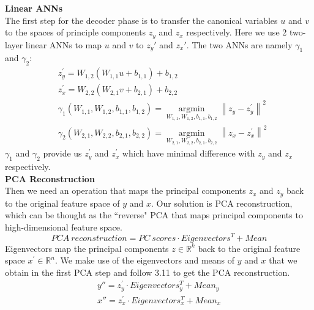 \documentclass[12pt]{report} %
\newcommand{\norm}[1]{\left\lVert #1 \right\rVert}
\begin{document}
\textbf{Linear ANNs}\\
The first step for the decoder phase is to transfer the canonical variables $u$ and $v$ to the spaces of principle components $z_y$ and $z_x$ respectively. Here we use 2 two-layer linear ANNs to map $u$ and $v$ to $z_y{'}$ and $z_x{'}$. The two ANNs are namely $\gamma_1$ and $\gamma_2$:
\begin{equation}
\begin{split}
&z_y^{'}=W_{1,2}(W_{1,1}u+b_{1,1})+b_{1,2} \\
&z_x^{'}=W_{2,2}(W_{2,1}v+b_{2,1})+b_{2,2} \\
&\gamma_1(W_{1,1},W_{1,2},b_{1,1},b_{1,2})=\operatorname*{argmin}_{W_{1,1},W_{1,2},b_{1,1},b_{1,2}}\norm{z_y-z_y^{'}}^2 \\
&\gamma_2(W_{2,1},W_{2,2},b_{2,1},b_{2,2})=\operatorname*{argmin}_{W_{2,1},W_{2,2},b_{2,1},b_{2,2}}\norm{z_x-z_x^{'}}^2
\end{split}
\end{equation}
$\gamma_1$ and $\gamma_2$ provide us $z_y^{'}$ and $z_x^{'}$ which have minimal difference with $z_y$ and $z_x$ respectively.\\

\textbf{PCA Reconstruction}\\
Then we need an operation that maps the principal components $z_x$ and $z_y$ back to the original feature space of $y$ and $x$. Our solution is PCA reconstruction, which can be thought as the ``reverse" PCA that maps principal components to high-dimensional feature space.
\begin{equation}
PCA\ reconstruction=PC\ scores \cdot Eigenvectors^T + Mean
\end{equation}
Eigenvectors map the principal components $z\in \mathbb{R}^{k}$ back to the original feature space $x^{'}\in \mathbb{R}^{n}$. We make use of the eigenvectors and means of $y$ and $x$ that we obtain in the first PCA step and follow 3.11 to get the PCA reconstruction.
\begin{equation}
\begin{split}
y''= z_y^{'}\cdot Eigenvectors_{y}^T + Mean_y \\
x''= z_x^{'}\cdot Eigenvectors_{x}^T + Mean_x
\end{split}
\end{equation}
\end{document}
